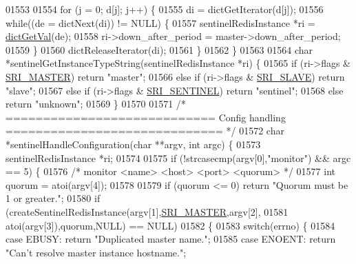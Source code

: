 \begin{DoxyCode}
{{{{{{{{{{{{{{{{{{01553 
01554     \textcolor{keywordflow}{for} (j = 0; d[j]; j++) \{
01555         di = dictGetIterator(d[j]);
01556         \textcolor{keywordflow}{while}((de = dictNext(di)) != NULL) \{
01557             sentinelRedisInstance *ri = \hyperlink{dict_8h_ae8d2cc391873b2bea2b87c4f80f43120}{dictGetVal}(de);
01558             ri->down\_after\_period = master->down\_after\_period;
01559         \}
01560         dictReleaseIterator(di);
01561     \}
01562 \}
01563 
01564 \textcolor{keywordtype}{char} *sentinelGetInstanceTypeString(sentinelRedisInstance *ri) \{
01565     \textcolor{keywordflow}{if} (ri->flags & \hyperlink{sentinel_8c_a2ee83e5ff67b45746cd6a310f15334b2}{SRI\_MASTER}) \textcolor{keywordflow}{return} \textcolor{stringliteral}{"master"};
01566     \textcolor{keywordflow}{else} \textcolor{keywordflow}{if} (ri->flags & \hyperlink{sentinel_8c_a4b9db21eda79d49bd9fdf2cf7b3178e8}{SRI\_SLAVE}) \textcolor{keywordflow}{return} \textcolor{stringliteral}{"slave"};
01567     \textcolor{keywordflow}{else} \textcolor{keywordflow}{if} (ri->flags & \hyperlink{sentinel_8c_a8ed55207b2af5d2dd314c951ef253f64}{SRI\_SENTINEL}) \textcolor{keywordflow}{return} \textcolor{stringliteral}{"sentinel"};
01568     \textcolor{keywordflow}{else} \textcolor{keywordflow}{return} \textcolor{stringliteral}{"unknown"};
01569 \}
01570 
01571 \textcolor{comment}{/* ============================ Config handling ============================= */}
01572 \textcolor{keywordtype}{char} *sentinelHandleConfiguration(\textcolor{keywordtype}{char} **argv, \textcolor{keywordtype}{int} argc) \{
01573     sentinelRedisInstance *ri;
01574 
01575     \textcolor{keywordflow}{if} (!strcasecmp(argv[0],\textcolor{stringliteral}{"monitor"}) && argc == 5) \{
01576         \textcolor{comment}{/* monitor <name> <host> <port> <quorum> */}
01577         \textcolor{keywordtype}{int} quorum = atoi(argv[4]);
01578 
01579         \textcolor{keywordflow}{if} (quorum <= 0) \textcolor{keywordflow}{return} \textcolor{stringliteral}{"Quorum must be 1 or greater."};
01580         \textcolor{keywordflow}{if} (createSentinelRedisInstance(argv[1],\hyperlink{sentinel_8c_a2ee83e5ff67b45746cd6a310f15334b2}{SRI\_MASTER},argv[2],
01581                                         atoi(argv[3]),quorum,NULL) == NULL)
01582         \{
01583             \textcolor{keywordflow}{switch}(errno) \{
01584             \textcolor{keywordflow}{case} EBUSY: \textcolor{keywordflow}{return} \textcolor{stringliteral}{"Duplicated master name."};
01585             \textcolor{keywordflow}{case} ENOENT: \textcolor{keywordflow}{return} \textcolor{stringliteral}{"Can't resolve master instance hostname."};
}}}}}}}}}}}}}}}}}}
\end{DoxyCode}

